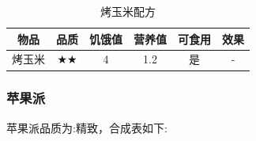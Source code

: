 \begin{table}[H]
    \centering
    \caption{烤玉米配方}
    \setlength{\tabcolsep}{4mm}
    \begin{tabular}{c|ccc|cc}
        \toprule
        \textbf{物品} & \textbf{品质} & \textbf{饥饿值} & \textbf{营养值} & \textbf{可食用} & \textbf{效果}\\
        \midrule
        烤玉米 & $\bigstar \bigstar$ & 4 & 1.2 & 是 & - \\
        \bottomrule
    \end{tabular}
\end{table}

\subsubsection{苹果派}

苹果派品质为:精致，合成表如下:

